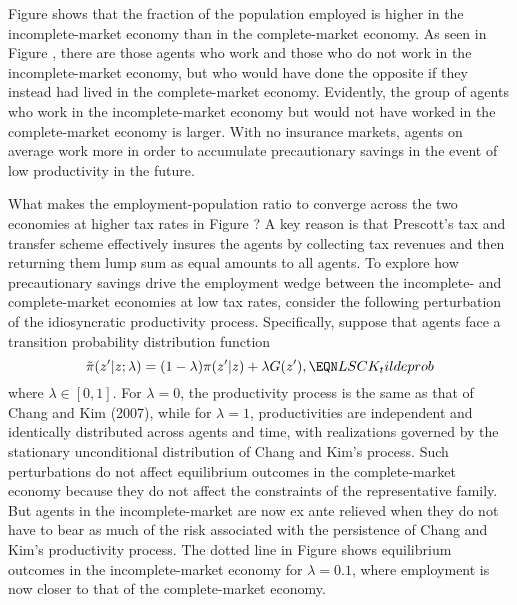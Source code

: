 Figure  shows that the fraction of the population employed
is higher in the incomplete-market economy than in the
complete-market economy. As seen in
Figure , there are  those agents who work and those who
do not work in the incomplete-market economy, but who would have done the opposite
 if they instead had lived in the complete-market economy.
Evidently, the  group of agents who work in the incomplete-market
economy but would not have worked in the complete-market economy is larger.
With no insurance markets, agents on average work more in order to
accumulate precautionary savings in the event of low productivity in the
future.
%
%
%
%

What makes the employment-population ratio to converge across
the two economies at higher tax rates in Figure ? A key
reason is that Prescott's tax and transfer scheme  effectively
 insures the agents by collecting  tax revenues and then returning them
 lump sum as equal amounts to all agents. To  explore
how precautionary savings drive the employment wedge
between the incomplete- and complete-market economies at low tax rates,
 consider the following perturbation of the idiosyncratic productivity
process. Specifically, suppose that  agents face a transition
probability distribution function
$$
\tilde \pi(z ' \vert z; \lambda) =
(1-\lambda) \pi(z ' \vert z) + \lambda G(z'),   \EQN LSCK_tildeprob
$$
where $\lambda\in[0,1]$. For $\lambda=0$, the productivity process is
the same as that of Chang and Kim (2007), while for $\lambda=1$,
productivities are independent and identically distributed across agents
and time, with realizations governed by the stationary unconditional
distribution of Chang and Kim's process.
Such perturbations do not affect equilibrium outcomes in the
complete-market economy because they do not affect the constraints of the representative
family. But  agents in the incomplete-market are now
ex ante relieved when they do not have to bear as much of the risk
associated with the persistence of Chang and Kim's productivity
process. The dotted line in Figure  shows equilibrium outcomes
in the incomplete-market economy for $\lambda=0.1$, where employment is now closer
to that of the complete-market economy.


